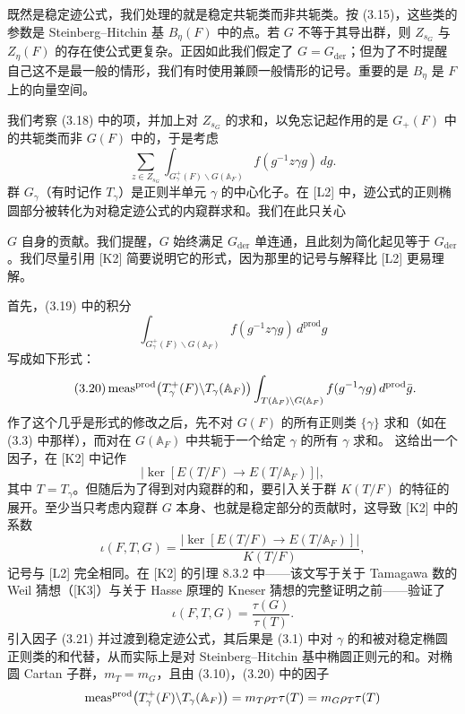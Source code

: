 既然是稳定迹公式，我们处理的就是稳定共轭类而非共轭类。按 (3.15)，这些类的参数是 Steinberg–Hitchin 基 $B_\eta(F)$ 中的点。若 $G$ 不等于其导出群，则 $Z_{s_G}$ 与 $Z_\eta(F)$ 的存在使公式更复杂。正因如此我们假定了 $G=G_{\mathrm{der}}$；但为了不时提醒自己这不是最一般的情形，我们有时使用兼顾一般情形的记号。重要的是 $B_\eta$ 是 $F$ 上的向量空间。

我们考察 (3.18) 中的项，并加上对 $Z_{s_G}$ 的求和，以免忘记起作用的是 $G_+(F)$ 中的共轭类而非 $G(F)$ 中的，于是考虑
\begin{equation}\tag{3.19}
\sum_{z\in Z_{s_G}}\int_{G^+_\gamma(F)\backslash G(\mathbb A_F)}f(g^{-1}z\gamma g)\,dg.
\end{equation}
群 $G_\gamma$（有时记作 $T_\gamma$）是正则半单元 $\gamma$ 的中心化子。在 [L2] 中，迹公式的正则椭圆部分被转化为对稳定迹公式的内窥群求和。我们在此只关心

$G$ 自身的贡献。我们提醒，$G$ 始终满足 $G_{\mathrm{der}}$ 单连通，且此刻为简化起见等于 $G_{\mathrm{der}}$。我们尽量引用 [K2] 简要说明它的形式，因为那里的记号与解释比 [L2] 更易理解。

首先，(3.19) 中的积分
\[
\int_{G^+_\gamma(F)\backslash G(\mathbb A_F)}f(g^{-1}z\gamma g)\,d^{\mathrm{prod}}g
\]
写成如下形式：
\begin{equation}\tag{3.20}
\operatorname{meas}^{\mathrm{prod}}\bigl(T^+_\gamma(F)\backslash T_\gamma(\mathbb A_F)\bigr)
\int_{T(\mathbb A_F)\backslash G(\mathbb A_F)}f(g^{-1}\gamma g)\,d^{\mathrm{prod}}\bar g.
\end{equation}
作了这个几乎是形式的修改之后，先不对 $G(F)$ 的所有正则类 $\{\gamma\}$ 求和（如在 (3.3) 中那样），而对在 $G(\mathbb A_F)$ 中共轭于一个给定 $\gamma$ 的所有 $\gamma$ 求和。 这给出一个因子，在 [K2] 中记作
\[
\bigl|\ker[E(T/F)\to E(T/\mathbb A_F)]\bigr|,
\]
其中 $T=T_\gamma$。但随后为了得到对内窥群的和，要引入关于群 $K(T/F)$ 的特征的展开。至少当只考虑内窥群 $G$ 本身、也就是稳定部分的贡献时，这导致 [K2] 中的系数
\begin{equation}\tag{3.21}
\iota(F,T,G)=\frac{\bigl|\ker[E(T/F)\to E(T/\mathbb A_F)]\bigr|}{K(T/F)},
\end{equation}
记号与 [L2] 完全相同。在 [K2] 的引理 8.3.2 中——该文写于关于 Tamagawa 数的 Weil 猜想（[K3]）与关于 Hasse 原理的 Kneser 猜想的完整证明之前——验证了
\begin{equation}\tag{3.22}
\iota(F,T,G)=\frac{\tau(G)}{\tau(T)}.
\end{equation}
引入因子 (3.21) 并过渡到稳定迹公式，其后果是 (3.1) 中对 $\gamma$ 的和被对稳定椭圆正则类的和代替，从而实际上是对 Steinberg–Hitchin 基中椭圆正则元的和。对椭圆 Cartan 子群，$m_T=m_G$，且由 (3.10)，(3.20) 中的因子
\[
\operatorname{meas}^{\mathrm{prod}}\bigl(T^+_\gamma(F)\backslash T_\gamma(\mathbb A_F)\bigr)
=m_T\rho_T\tau(T)=m_G\rho_T\tau(T)
\]

